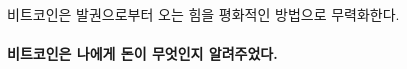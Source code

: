 비트코인은 발권으로부터 오는 힘을 평화적인 방법으로 무력화한다. 



\begin{comment}
	돈은 여러 차례 반복을 거치고 있다. 
	대부분의 반복은 괜찮았다. 어떤 식으로든 돈이 개선되었다.
	그러나 최근에 화폐의 내부 작동이 손상되었다.
	오늘날 거의 모든 화폐는 권력에 의해 무에서 유를 창조하고 있다. 
	어떻게 이런 일이 벌어졌는지 이해하기 위해 나는 돈의 역사와 돈의 몰락에 대해 배워야 했다.
\end{comment}

\begin{comment}
	이 부패를 바로잡기 위해서 일련의 재앙이 불어닥쳐야할지 아니면 단순히 훌륭한 교육이 필요할지는 아직 미지수이다. 
	나는 건전 화폐의 신에게 후자가 되기를 기도해본다.
\end{comment}


\paragraph{비트코인은 나에게 돈이 무엇인지 알려주었다.}

%
%
%
%
